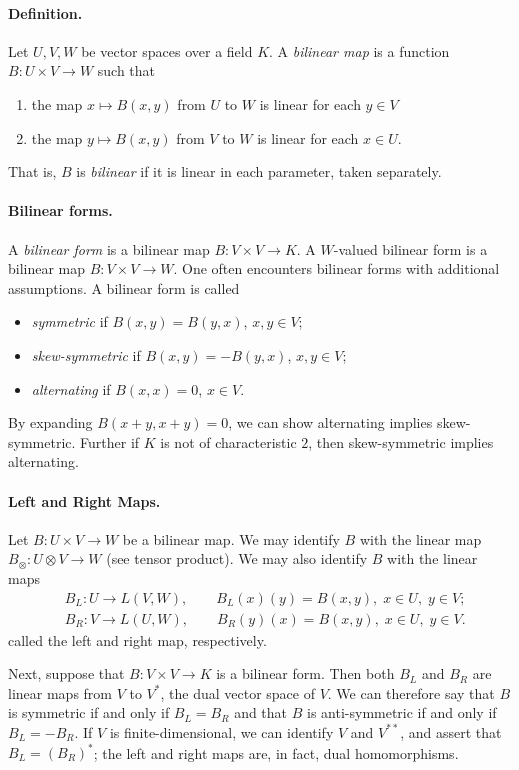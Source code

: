 \documentclass[12pt]{article}
\begin{document}
\paragraph{Definition.}
Let $U,V,W$ be vector spaces over a field $K$.  A  \emph{bilinear map}
is a function $B: U
\times V \to W$ such that 
\begin{enumerate}
\item the map $x \mapsto B(x,y)$ from $U$ to $W$ is linear for each $y
  \in V$
\item the map $y \mapsto B(x,y)$ from $V$ to $W$ is linear for each $x
  \in U$.
\end{enumerate}
That is, $B$ is \emph{bilinear} if it is linear in each parameter,
taken separately.  

\paragraph{Bilinear forms.}
A \emph{bilinear form} is a bilinear map $B:V\times V\to K$.  A
$W$-valued bilinear form is a bilinear map $B: V\times V\to W$.  One
often encounters bilinear forms with additional assumptions.  A
bilinear form is called
\begin{itemize}
\item \emph{symmetric} if $B(x,y) = B(y,x)$, $x,y \in V$;
\item \emph{skew-symmetric} if $B(x,y) = -B(y,x)$, $x,y \in V$;
\item \emph{alternating} if $B(x,x) = 0$, $x \in V$.
\end{itemize}
By expanding $B(x+y,x+y) = 0$, we can show alternating implies
skew-symmetric. Further if $K$ is not of characteristic $2$, then
skew-symmetric implies alternating.

\paragraph{Left and Right Maps.}
Let $B:U\times V\to W$ be a bilinear map. We may identify $B$ with the
linear map $B_\otimes: U\otimes V\to W$ (see tensor product).  We may
also identify $B$ with the linear maps
\begin{align*}
  & B_L:U\to L(V,W),\qquad B_L(x)(y) = B(x,y),\; x\in U,\; y\in V;\\
  & B_R:V\to L(U,W),\qquad B_R(y)(x) = B(x,y),\; x\in U,\; y\in V.
\end{align*}
called the left and right map, respectively.  

Next, suppose that $B:V\times V\to K$ is a bilinear form.  Then both
$B_L$ and $B_R$ are linear maps from $V$ to $V^*$, the dual vector
space of $V$. We can therefore say that $B$ is symmetric if and only
if $B_L = B_R$ and that $B$ is anti-symmetric if and only if
$B_L=-B_R$.  If $V$ is finite-dimensional, we can identify $V$ and
$V^{**}$, and assert that $B_L=(B_R)^*$; the left and right maps are, in
fact, dual homomorphisms.
\end{document}
